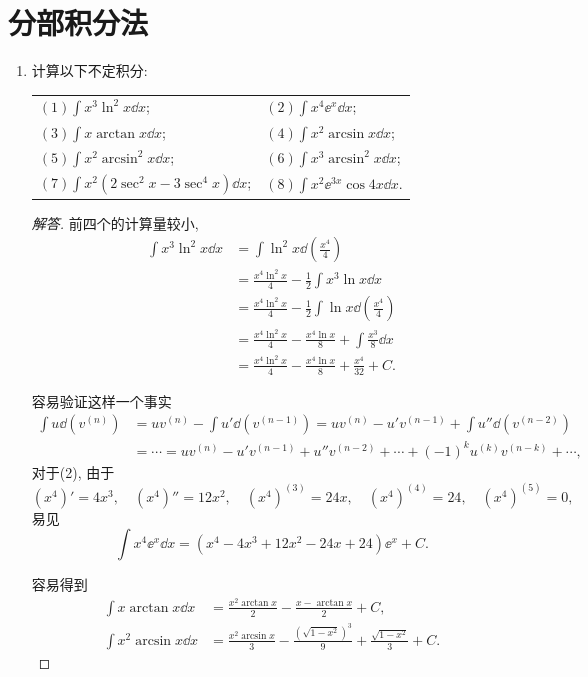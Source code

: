 \section{分部积分法}
\begin{3a}
\begin{enumerate}
\item 计算以下不定积分:\\
\begin{center}\begin{tabular}{ll}
\((1)\int x^3\ln^2x\dd x\);&\((2)\int x^4\ee^x\dd x\);\\
\((3)\int x\arctan x\dd x\);&\((4)\int x^2\arcsin x\dd x\);\\
\((5)\int x^2\arcsin^2x\dd x\);&\((6)\int x^3\arcsin^2x\dd x\);\\
\((7)\int x^2(2\sec^2x-3\sec^4x)\dd x\);
&\((8)\int x^2\ee^{3x}\cos 4x\dd x\).
\end{tabular}\end{center}
\begin{proof}[解答]
前四个的计算量较小, \[\begin{aligned}
\int x^3\ln^2x\dd x&=\int\ln^2x\dd\left(\frac{x^4}{4}\right)\\
&=\frac{x^4\ln^2x}{4}-\frac{1}{2}\int x^3\ln x\dd x\\
&=\frac{x^4\ln^2x}{4}-\frac{1}{2}\int\ln x\dd\left(\frac{x^4}{4}\right)\\
&=\frac{x^4\ln^2x}{4}-\frac{x^4\ln x}{8}+\int\frac{x^3}{8}\dd x\\
&=\frac{x^4\ln^2x}{4}-\frac{x^4\ln x}{8}+\frac{x^4}{32}+C.\end{aligned}\]

容易验证这样一个事实\[\begin{aligned}
\int u\dd \left(v^{(n)}\right)&=uv^{(n)}-\int u'\dd\left(v^{(n-1)}\right)
=uv^{(n)}-u'v^{(n-1)}+\int u''\dd\left(v^{(n-2)}\right)\\
&=\cdots=uv^{(n)}-u'v^{(n-1)}+u''v^{(n-2)}+\cdots+(-1)^ku^{(k)}v^{(n-k)}+\cdots,
\end{aligned}\]对于(2), 由于
\[\left(x^4\right)'=4x^3,\quad\left(x^4\right)''=12x^2,\quad\left(x^4\right)^{(3)}=24x,\quad\left(x^4\right)^{(4)}=24,\quad\left(x^4\right)^{(5)}=0,\]易见\[\int x^4\ee^x\dd x=\left(x^4-4x^3+12x^2-24x+24\right)\ee^x+C.\]

容易得到
\[\begin{aligned}
\int x\arctan x\dd x&=\frac{x^2\arctan x}{2}-\frac{x-\arctan x}{2}+C,\\
\int x^2\arcsin x\dd x&=\frac{x^2\arcsin x}{3}-\frac{\left(\sqrt{1-x^2}\right)^3}{9}+\frac{\sqrt{1-x^2}}{3}+C.
\end{aligned}\]


\end{proof}
\end{enumerate}
\end{3a}
